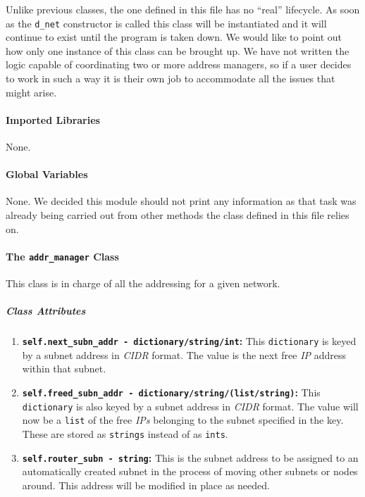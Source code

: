     Unlike previous classes, the one defined in this file has no ``real'' lifecycle. As soon as the \texttt{d\_net} constructor is called this class will be instantiated and it will continue to exist until the program is taken down. We would like to point out how only one instance of this class can be brought up. We have not written the logic capable of coordinating two or more address managers, so if a user decides to work in such a way it is their own job to accommodate all the issues that might arise.\\

    \paragraph{Imported Libraries}
        None.

    \paragraph{Global Variables}
        None. We decided this module should not print any information as that task was already being carried out from other methods the class defined in this file relies on.

    \paragraph{The \texttt{addr\_manager} Class}
        This class is in charge of all the addressing for a given network.

        \subparagraph{Class Attributes}
            \begin{enumerate}
                \item \textbf{\texttt{self.next\_subn\_addr - dictionary/string/int}:} This \texttt{dictionary} is keyed by a subnet address in \textit{CIDR} format. The value is the next free \textit{IP} address within that subnet.
                \item \textbf{\texttt{self.freed\_subn\_addr - dictionary/string/(list/string)}:} This \texttt{dictionary} is also keyed by a subnet address in \textit{CIDR} format. The value will now be a \texttt{list} of the free \textit{IPs} belonging to the subnet specified in the key. These are stored as \texttt{strings} instead of as \texttt{ints}.
                \item \textbf{\texttt{self.router\_subn - string}:} This is the subnet address to be assigned to an automatically created subnet in the process of moving other subnets or nodes around. This address will be modified in place as needed.
            \end{enumerate}

